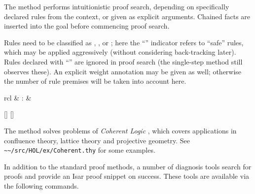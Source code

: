 \begin{isabellebody}
\begin{isamarkuptext}
  The \hyperlink{method.HOL.iprover}{\mbox{}} method performs intuitionistic proof
  search, depending on specifically declared rules from the context,
  or given as explicit arguments.  Chained facts are inserted into the
  goal before commencing proof search.

  Rules need to be classified as \hyperlink{attribute.Pure.intro}{\mbox{}},
  \hyperlink{attribute.Pure.elim}{\mbox{}}, or \hyperlink{attribute.Pure.dest}{\mbox{}}; here the
  ``'' indicator refers to ``safe'' rules, which may be
  applied aggressively (without considering back-tracking later).
  Rules declared with ``'' are ignored in proof search (the
  single-step \hyperlink{method.Pure.rule}{\mbox{}} method still observes these).  An
  explicit weight annotation may be given as well; otherwise the
  number of rule premises will be taken into account here.%
\end{isamarkuptext}%
\isamarkuptrue%
%
\isamarkuptrue%
%
\begin{isamarkuptext}%
\begin{matharray}{rcl}
    \hypertarget{method.HOL.coherent}{\hyperlink{method.HOL.coherent}{\mbox{}}} & : &  \\
  \end{matharray}

  \begin{railoutput}
[]
\rail@bar
{}
[]
\rail@endbar
\rail@end
\end{railoutput}


  The \hyperlink{method.HOL.coherent}{\mbox{}} method solves problems of
  \emph{Coherent Logic} \cite{Bezem-Coquand:2005}, which covers
  applications in confluence theory, lattice theory and projective
  geometry.  See \verb|~~/src/HOL/ex/Coherent.thy| for some
  examples.%
\end{isamarkuptext}%
\isamarkuptrue%
%
\isamarkuptrue%
%
\begin{isamarkuptext}%
In addition to the standard proof methods, a number of diagnosis
  tools search for proofs and provide an Isar proof snippet on success.
  These tools are available via the following commands.


\end{isamarkuptext}
\end{isabellebody}
